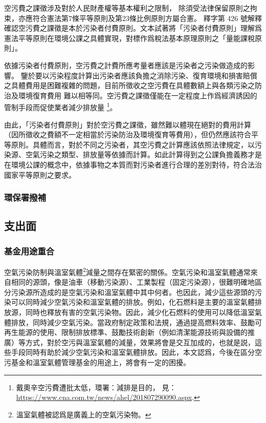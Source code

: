 \documentclass[12pt,a4paper]{article}
\begin{document}
空污費之課徵涉及對於人民財產權等基本權利之限制，
除須受法律保留原則之拘束，亦應符合憲法第7條平等原則及第23條比例原則方屬合憲。
釋字第 426 號解釋確認空污費之課徵是本於污染者付費原則。文本試著將「污染者付費原則」理解爲憲法平等原則在環境公課之具體實現，對標作爲稅法基本原理原則之「量能課稅原則」。

依據污染者付費原則，空污費之計費所應考量者應該是污染者之污染做造成的影響。
鑒於要以污染程度計算出污染者應該負擔之消除污染、復育環境和損害賠償之具體費用是困難複雜的問題，目前所徵收之空污費在具體數額上與各類污染之防治及環境復育費用
難以相等同。空污費之課徵僅能在一定程度上作爲經濟誘因的管制手段而促使業者減少排放量
\footnote{戴奧辛空污費遭批太低，環署：減排是目的，
見：\url{https://www.cna.com.tw/news/ahel/201807290090.aspx}.}。

由此，「污染者付費原則」對於空污費之課徵，雖然難以體現在絕對的費用計算（因所徵收之費額不一定相當於污染防治及環境復育等費用），但仍然應該符合平等原則。具體而言，對於不同之污染者，其空污費之計算應該依照法律規定，以污染源、空氣污染之類型、排放量等依據而計算。如此計算得到之公課負擔義務才是在環境公課的概念中，依據事物之本質而對污染者進行合理的差別對待，符合法治國家平等原則之要求。



\subsubsection{環保署撥補}




\subsection{支出面}

\subsubsection{基金用途重合}

空氣污染防制與溫室氣體\footnote{溫室氣體被認爲是廣義上的空氣污染物。}減量之間存在緊密的關係。空氣污染和溫室氣體通常來自相同的源頭，像是油車（移動污染源）、工業製程（固定污染源），很難明確地區分污染源所造成的是空氣污染和溫室氣體中其中何者。也因此，減少這些源頭的污染可以同時減少空氣污染和溫室氣體的排放。例如，化石燃料是主要的溫室氣體排放源，同時也釋放有害的空氣污染物。因此，減少化石燃料的使用可以降低溫室氣體排放，同時減少空氣污染。當政府制定政策和法規，通過提高燃料效率、鼓勵可再生能源的使用、限制排放標準、鼓勵技術創新（例如清潔能源技術與設備的推廣）等方式，對於空污與溫室氣體的減量，效果將會是交互加成的，也就是説，這些手段同時有助於減少空氣污染和溫室氣體排放。因此，本文認爲，今後在區分空污基金和溫室氣體管理基金的用途上，將會有一定的困擾。
\end{document}
